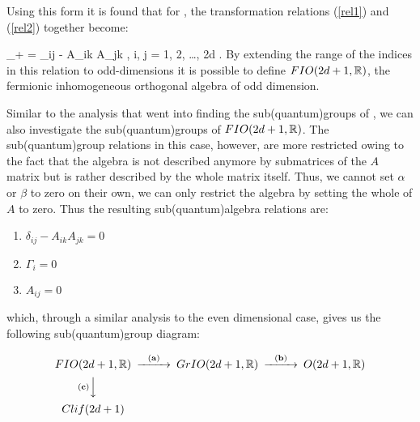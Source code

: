 Using this form it is found that for \FIO, the transformation
relations (\ref{rel1}) and (\ref{rel2}) together become:

_+ = \delta_{ij} - A_{ik} A_{jk}
\quad\quad, i, j = 1, 2, \ldots , 2d . \eeq By extending the range
of the indices in this relation to odd-dimensions it is possible
to define $FIO(2d + 1, \mathbb{R})$, the fermionic inhomogeneous
orthogonal algebra of odd dimension.

Similar to the analysis that went into finding the
sub(quantum)groups of \FIO, we can also investigate the
sub(quantum)groups of $FIO(2d + 1, \mathbb{R})$. The sub(quantum)group
relations in this case, however, are more restricted owing to the
fact that the algebra is not described anymore by submatrices of
the $A$ matrix but is rather described by the whole matrix itself.
Thus, we cannot set $\alpha$ or $\beta$ to zero on their own, we
can only restrict the algebra by setting the whole of $A$ to zero.
Thus the resulting sub(quantum)algebra relations are:

\begin{enumerate}
\renewcommand{\labelenumi}{\bf(\alph{enumi})}
\item $\delta_{ij} - A_{ik}A_{jk} = 0$
\item $\Gamma_i = 0$
\item $A_{ij} = 0$
\end{enumerate}
which, through a similar analysis to the even dimensional case,
gives us the following sub(quantum)group diagram:

\[
\begin{CD}
{FIO(2d + 1, \IR)} @>{\bf (a)}>> {GrIO(2d + 1, \IR)} @>{\bf (b)}>> {O(2d + 1, \IR)} \\
@V{\bf (c)}VV\\
{Clif(2d + 1)}
\end{CD}
\]

